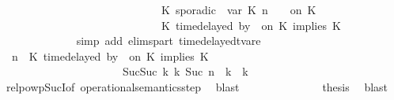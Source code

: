 \begin{isabellebody}
\ \ \ \ \ \ \ \ \ \ \ \ \ \ \ \ \ \ \ \ \ \ \ \ \ \ \ \ {\isasymturnstile}\ {\isacharparenleft}K\ sporadic{\isasymsharp}\ {\isasymlparr}\ {\isasymtau}\isactrlsub v\isactrlsub a\isactrlsub r\ {\isacharparenleft}K\ n{\isacharparenright}\ {\isasymoplus}\ {\isasymdelta}{\isasymtau}\ {\isasymrparr}\ on\ K\ {\isacharhash}\ {\isasymPsi}\isanewline
\ \ \ \ \ \ \ \ \ \ \ \ \ \ \ \ \ \ \ \ \ \ \ \ \ \ \ \ {\isasymtriangleright}\ {\isacharparenleft}{\isacharparenleft}K\ time{\isacharminus}delayed{\isasymsharp}\ by\ {\isasymdelta}{\isasymtau}\ on\ K\ implies\ K\ {\isacharhash}\ {\isasymPhi}{\isacharparenright}{\isacharparenright}{\isacartoucheclose}\isanewline
\ \ \ \ \ \ \ \ \ \ \ \ \isamarkupfalse%
\ {\isacharparenleft}simp\ add{\isacharcolon}\ elims{\isacharunderscore}part\ timedelayed{\isacharunderscore}tvar{\isacharunderscore}e{}{\isacharparenright}\isanewline
\ \ \ \ \ \ \ \ \ \ \isamarkupfalse%
\ \isamarkupfalse%
\ {\isacartoucheopen}{\isacharparenleft}{\isasymGamma}{\isacharcomma}\ n\ {\isasymturnstile}\ {\isacharparenleft}{\isacharparenleft}K\ time{\isacharminus}delayed{\isasymsharp}\ by\ {\isasymdelta}{\isasymtau}\ on\ K\ implies\ K\ {\isacharhash}\ {\isasymPsi}{\isacharparenright}\ {\isasymtriangleright}\ {\isasymPhi}{\isacharparenright}\isanewline
\ \ \ \ \ \ \ \ \ \ \ \ \ \ \ \ \ \ \ \ \ \ {\isasymhookrightarrow}\isactrlbsup Suc{\isacharparenleft}Suc\ k{\isacharparenright}\isactrlesup \ {\isacharparenleft}{\isasymGamma}\isactrlsub k{\isacharcomma}\ Suc\ n\ {\isasymturnstile}\ {\isasymPsi}\isactrlsub k\ {\isasymtriangleright}\ {\isasymPhi}\isactrlsub k{\isacharparenright}{\isacartoucheclose}\isanewline
\ \ \ \ \ \ \ \ \ \ \ \ \isamarkupfalse%
\ relpowp{\isacharunderscore}Suc{\isacharunderscore}I{}{\isacharbrackleft}of\ {\isacartoucheopen}operational{\isacharunderscore}semantics{\isacharunderscore}step{\isacartoucheclose}{\isacharbrackright}\ \isamarkupfalse%
\ blast\isanewline
\ \ \ \ \ \ \ \ \ \ \isamarkupfalse%
\ {\isacharasterisk}\ \isamarkupfalse%
\ {\isacharquery}thesis\ \isamarkupfalse%
\ blast\isanewline
\ \ \ \ \ \ \ \ \isamarkupfalse%
\isanewline
\ \ \ \ \ \ \isamarkupfalse%

\end{isabellebody}
